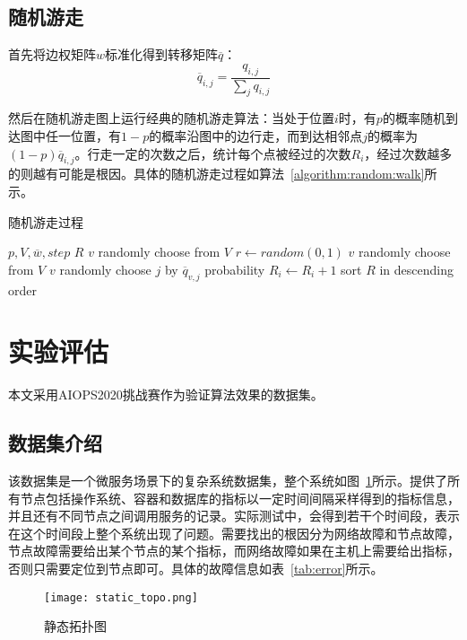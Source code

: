 \subsection{随机游走}
首先将边权矩阵$w$标准化得到转移矩阵$\overline{q}$：
\begin{equation*}
  \overline{q}_{i,j} = \frac{q_{i,j}}{\sum_jq_{i,j}}
\end{equation*}

然后在随机游走图上运行经典的随机游走算法：当处于位置$i$时，有$p$的概率随机到达图中任一位置，有$1-p$的概率沿图中的边行走，而到达相邻点$j$的概率为$(1-p)\overline{q}_{i,j}$。行走一定的次数之后，统计每个点被经过的次数$R_i$，经过次数越多的则越有可能是根因。具体的随机游走过程如算法~\ref{algorithm:random:walk}所示。

\begin{algorithm}
  \caption{随机游走过程}
  \begin{algorithmic}[1]
      \Require $p,V,\overline{w},step$
      \Ensure $R$
      \State $v$ \gets randomly choose from $V$
      \Repeat
      \State $r \gets random(0,1)$
        \State $v$ \gets randomly choose from $V$
      \Else
        \State $v$ \gets randomly choose $j$ by $\overline{q}_{v,j}$ probability
      \EndIf
      \State $R_i \gets R_i + 1 $
      \State sort $R$ in descending order
  \end{algorithmic}
  \label{algorithm:random:walk}
\end{algorithm}
\section{实验评估}
本文采用AIOPS2020挑战赛作为验证算法效果的数据集。

\subsection{数据集介绍}

该数据集是一个微服务场景下的复杂系统数据集，整个系统如图~\ref{fig:static_topo}所示。提供了所有节点包括操作系统、容器和数据库的指标以一定时间间隔采样得到的指标信息，并且还有不同节点之间调用服务的记录。实际测试中，会得到若干个时间段，表示在这个时间段上整个系统出现了问题。需要找出的根因分为网络故障和节点故障，节点故障需要给出某个节点的某个指标，而网络故障如果在主机上需要给出指标，否则只需要定位到节点即可。具体的故障信息如表~\ref{tab:error}所示。

\begin{figure}[htbp]
    \centering
    \texttt{[image: static\_topo.png]}
    \caption{静态拓扑图}
    \label{fig:static_topo}
  \end{figure}

